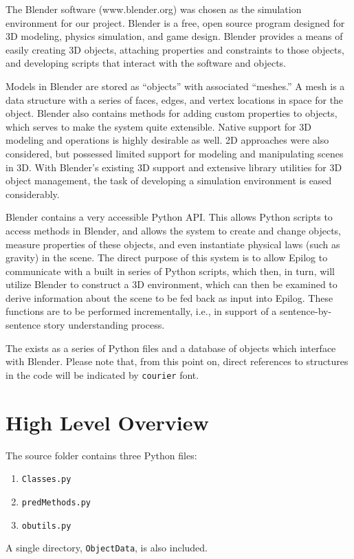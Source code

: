 The Blender software (www.blender.org) was chosen as the simulation environment for our project.
Blender is a free, open source program designed for 3D modeling, physics simulation, and game design. 
Blender provides a means of easily creating 3D objects, attaching properties and constraints to those objects, and developing scripts that interact with the software and objects.

Models in Blender are stored as ``objects'' with associated ``meshes.'' 
A mesh is a data structure with a series of faces, edges, and vertex locations in space for the object. 
Blender also contains methods for adding custom properties to objects, which serves to make the system quite extensible.
Native support for 3D modeling and operations is highly desirable as well. 2D approaches were also considered, but possessed limited support for modeling and manipulating scenes in 3D. 
With Blender's existing 3D support and extensive library utilities for 3D object management, the task of developing a simulation environment is eased considerably.

Blender contains a very accessible Python API. 
This allows Python scripts to access methods in Blender, and allows the system to create and change objects, measure properties of these objects, and even instantiate physical laws (such as gravity) in the scene. 
The direct purpose of this system is to allow Epilog to communicate with a built in series of Python scripts, which then, in turn, will utilize Blender to construct a 3D environment, which can then be examined to derive information about the scene to be fed back as input into Epilog. 
These functions are to be performed incrementally, i.e., in support of a sentence-by-sentence story understanding process. 

The \TDS exists as a series of Python files and a database of objects which interface with Blender. Please note that, from this point on, direct references to structures in the code will be indicated by \texttt{courier} font.

\section{High Level Overview}

The source folder contains three Python files: 
\begin{enumerate}
	\item \texttt{Classes.py}
	\item \texttt{predMethods.py}
	\item \texttt{obutils.py}
\end{enumerate}
A single directory, \texttt{ObjectData}, is also included.

